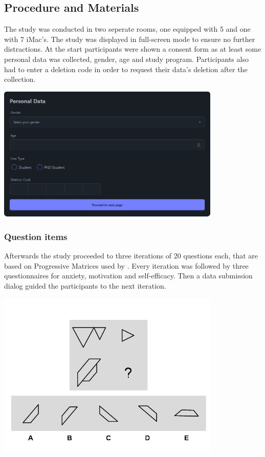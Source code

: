 \subsection{Procedure and Materials}
The study was conducted in two seperate rooms, one equipped with 5 and one with 7 iMac's. The study was displayed in full-screen mode to ensure no further distractions.
At the start participants were shown a consent form as at least some personal data was collected, gender, age and study program. Participants also had to enter a deletion code in order to request their data's deletion after the collection.
\FloatBarrier
\begin{minipage}{\textwidth}
    \includegraphics[width=0.8\textwidth]{img/details.png}
    \label{fig:figureDetails}
  \end{minipage}
  
\FloatBarrier
\subsubsection{Question items}
Afterwards the study proceeded to three iterations of 20 questions each, that are based on Progressive Matrices used by \Textcite{albuquerqueDoesGenderStereotype2017}.
Every iteration was followed by three questionnaires for anxiety, motivation and self-efficacy. Then a data submission dialog guided the participants to the next iteration.
\begin{minipage}{\textwidth}
    \includegraphics[width=0.8\textwidth]{img/q-17.png}
    \label{fig:figureMatrix}
  \end{minipage}
  
